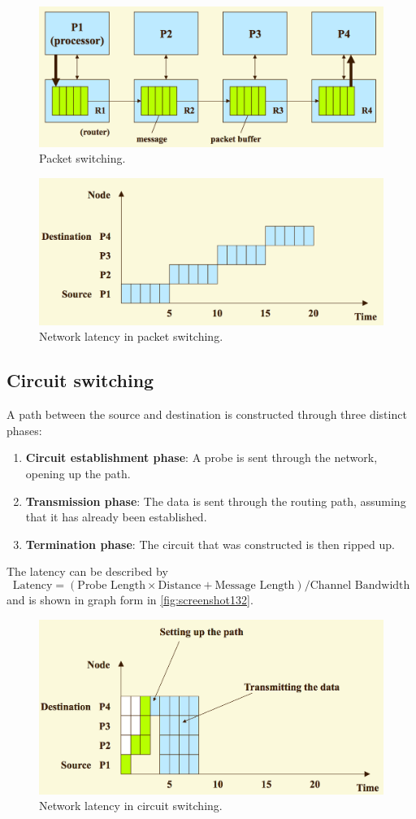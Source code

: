 \begin{figure}
\centering
\includegraphics[width=0.7\linewidth]{screenshot128}
\caption{Packet switching.}
\label{fig:screenshot128}
\end{figure}

\begin{figure}
\centering
\includegraphics[width=0.7\linewidth]{screenshot131}
\caption{Network latency in packet switching.}
\label{fig:screenshot131}
\end{figure}

\subsection{Circuit switching}
A path between the source and destination is constructed through three distinct phases: \begin{enumerate}
\item \textbf{Circuit establishment phase}: A probe is sent through the network, opening up the path.
\item \textbf{Transmission phase}: The data is sent through the routing path, assuming that it has already been established.
\item \textbf{Termination phase}: The circuit that was constructed is then ripped up.
\end{enumerate}

The latency can be described by
\[ \text{Latency} =  (\text{Probe Length} \times \text{Distance} + \text{Message Length})/\text{Channel Bandwidth} \]
and is shown in graph form in \autoref{fig:screenshot132}.

\begin{figure}
\centering
\includegraphics[width=0.7\linewidth]{screenshot132}
\caption{Network latency in circuit switching.}
\label{fig:screenshot132}
\end{figure}


